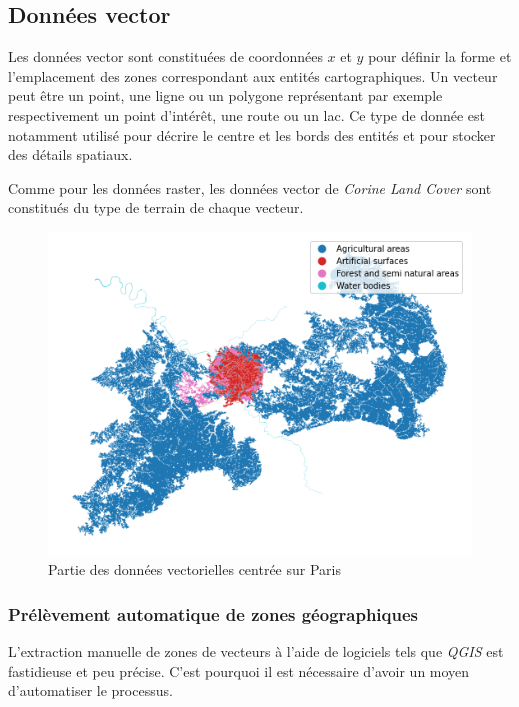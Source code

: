 \subsection{Données vector}


Les données vector sont constituées de coordonnées $x$ et $y$ pour définir la forme et l'emplacement des zones correspondant aux entités cartographiques.
Un vecteur peut être un point, une ligne ou un polygone représentant par exemple respectivement un point d'intérêt, une route ou un lac.
Ce type de donnée est notamment utilisé pour décrire le centre et les bords des entités et pour stocker des détails spatiaux.


Comme pour les données raster, les données vector de \emph{Corine Land Cover} sont constitués du type de terrain de chaque vecteur.




\begin{figure}
    \centering
    \includegraphics[scale=0.5]{figures/vector}
    \caption{Partie des données vectorielles centrée sur Paris}
\end{figure}

\subsubsection{Prélèvement automatique de zones géographiques}

L'extraction manuelle de zones de vecteurs à l'aide de logiciels tels que \emph{QGIS} est fastidieuse et peu précise.
C'est pourquoi il est nécessaire d'avoir un moyen d'automatiser le processus.

